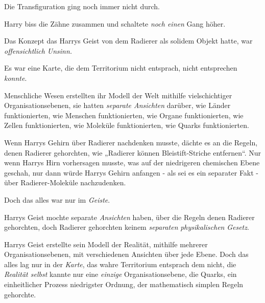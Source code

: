 Die Transfiguration ging noch immer nicht durch.

Harry biss die Zähne zusammen und schaltete \emph{noch einen} Gang höher.

Das Konzept das Harrys Geist von dem Radierer als solidem Objekt hatte, war \emph{offensichtlich Unsinn.}

Es war eine Karte, die dem Territorium nicht entsprach, nicht entsprechen \emph{konnte}.

Menschliche Wesen erstellten ihr Modell der Welt mithilfe vielschichtiger Organisationsebenen, sie hatten \emph{separate Ansichten} darüber, wie Länder funktionierten, wie Menschen funktionierten, wie Organe funktionierten, wie Zellen funktionierten, wie Moleküle funktionierten, wie Quarks funktionierten.

Wenn Harrys Gehirn über Radierer nachdenken musste, dächte es an die Regeln, denen Radierer gehorchten, wie „Radierer können Bleistift-Striche entfernen“. Nur wenn Harrys Hirn vorhersagen musste, was auf der niedrigeren chemischen Ebene geschah, nur dann würde Harrys Gehirn anfangen - als sei es ein separater Fakt - über Radierer-Moleküle nachzudenken.

Doch das alles war nur im \emph{Geiste}.

Harrys Geist mochte separate \emph{Ansichten} haben, über die Regeln denen Radierer gehorchten, doch Radierer gehorchten keinem \emph{separaten} \emph{physikalischen} \emph{Gesetz}.

Harrys Geist erstellte sein Modell der Realität, mithilfe mehrerer Organisationsebenen, mit verschiedenen Ansichten über jede Ebene. Doch das alles lag nur in der \emph{Karte}, das wahre Territorium entsprach dem nicht, die \emph{Realität selbst} kannte nur eine \emph{einzige} Organisationsebene, die Quarks, ein einheitlicher Prozess niedrigster Ordnung, der mathematisch simplen Regeln gehorchte.

